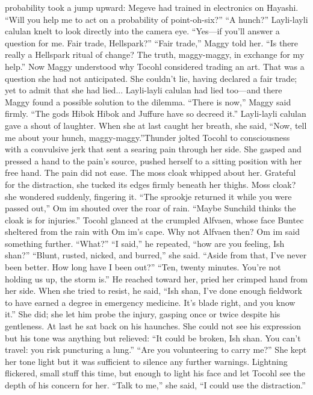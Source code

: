 \documentclass[9pt]{article}
\begin{document}
probability took a jump upward: Megeve had trained in electronics on Hayashi.
“Will you help me to act on a probability of point-oh-six?”
“A hunch?” Layli-layli calulan knelt to look directly into the camera eye. “Yes—if you’ll answer a
question for me. Fair trade, Hellspark?”
“Fair trade,” Maggy told her.
“Is there really a Hellspark ritual of change? The truth, maggy-maggy, in exchange for my help.”
Now Maggy understood why Tocohl considered trading an art. That was a question she had not
anticipated. She couldn’t lie, having declared a fair trade; yet to admit that she had lied... Layli-layli
calulan had lied too—and there Maggy found a possible solution to the dilemma.
“There is now,” Maggy said firmly. “The gods Hibok Hibok and Juffure have so decreed it.”
Layli-layli calulan gave a shout of laughter. When she at last caught her breath, she said, “Now, tell
me about your hunch, maggy-maggy.”Thunder jolted Tocohl to consciousness with a convulsive jerk that sent a searing pain through her
side. She gasped and pressed a hand to the pain’s source, pushed herself to a sitting position with her
free hand. The pain did not ease. The moss cloak whipped about her. Grateful for the distraction, she
tucked its edges firmly beneath her thighs.
Moss cloak? she wondered suddenly, fingering it.
“The sprookje returned it while you were passed out,” Om im shouted over the roar of rain. “Maybe
Sunchild thinks the cloak is for injuries.”
Tocohl glanced at the crumpled Alfvaen, whose face Buntec sheltered from the rain with Om im’s
cape. Why not Alfvaen then? Om im said something further.
“What?”
“I said,” he repeated, “how are you feeling, Ish shan?”
“Blunt, rusted, nicked, and burred,” she said. “Aside from that, I’ve never been better. How long
have I been out?”
“Ten, twenty minutes. You’re not holding us up, the storm is.” He reached toward her, pried her
crimped hand from her side. When she tried to resist, he said, “Ish shan, I’ve done enough fieldwork to
have earned a degree in emergency medicine. It’s blade right, and you know it.”
She did; she let him probe the injury, gasping once or twice despite his gentleness. At last he sat back
on his haunches. She could not see his expression but his tone was anything but relieved: “It could be
broken, Ish shan. You can’t travel: you risk puncturing a lung.”
“Are you volunteering to carry me?” She kept her tone light but it was sufficient to silence any further
warnings.
Lightning flickered, small stuff this time, but enough to light his face and let Tocohl see the depth of his
concern for her. “Talk to me,” she said, “I could use the distraction.”
\end{document}
